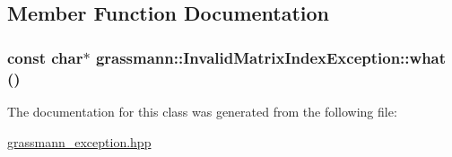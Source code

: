 \subsection{Member Function Documentation}
\hypertarget{classgrassmann_1_1InvalidMatrixIndexException_a1421e41a34728f9f7cc8a8c3d167150}{
\subsubsection[what]{\setlength{\rightskip}{0pt plus 5cm}const char$\ast$ grassmann::InvalidMatrixIndexException::what ()}}
\label{classgrassmann_1_1InvalidMatrixIndexException_a1421e41a34728f9f7cc8a8c3d167150}




The documentation for this class was generated from the following file:\begin{CompactItemize}
\item 
\hyperlink{grassmann__exception_8hpp}{grassmann\_\-exception.hpp}\end{CompactItemize}
